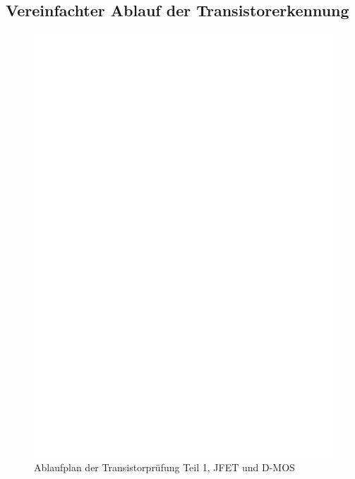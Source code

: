 \subsection{Vereinfachter Ablauf der Transistorerkennung}

\begin{figure}[H]
\centering
\includegraphics[]{../FIG/CheckSemi1.eps}
\caption{Ablaufplan der Transistorprüfung Teil 1, JFET und D-MOS}
\label{fig:ChkSemi1}
\end{figure}

